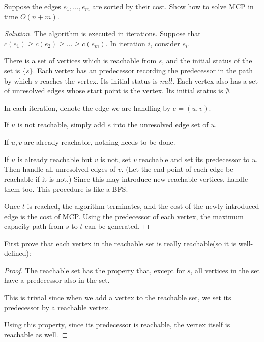 


    \maketitle

    \begin{thm}{}{}
        Suppose the edges $e_1,\dots, e_m$ are sorted by their cost. Show how to solve MCP in time $O(n+m)$.
    \end{thm}
    \begin{proof}[Solution]
        The algorithm is executed in iterations. Suppose that $c(e_1)\geq c(e_2)\geq\dots\geq c(e_m)$. In iteration $i$, consider $e_i$. 
        
        There is a set of vertices which is reachable from $s$, and the initial status of the set is $\{s\}$. 
        Each vertex has an predecessor recording the predecessor in the path by which $s$ reaches the vertex. Its initial status is $null$. 
        Each vertex also has a set of unresolved edges whose start point is the vertex. Its initial status is $\emptyset$.
        
        In each iteration, denote the edge we are handling by $e=(u,v)$. 
        
        If $u$ is not reachable, simply add $e$ into the unresolved edge set of $u$. 
        
        If $u,v$ are already reachable, nothing needs to be done. 
        
        If $u$ is already reachable but $v$ is not, set $v$ reachable and set its predecessor to $u$. 
        Then handle all unresolved edges of $v$. (Let the end point of each edge be reachable if it is not.)
        Since this may introduce new reachable vertices, handle them too. This procedure is like a BFS. 
        
        Once $t$ is reached, the algorithm terminates, and the cost of the newly introduced edge is the cost of MCP. 
        Using the predecessor of each vertex, the maximum capacity path from $s$ to $t$ can be generated.
    \end{proof}
    
    \bigskip
    
    First prove that each vertex in the reachable set is really reachable(so it is well-defined): 
    \begin{proof}[Proof]
        The reachable set has the property that, except for $s$, all vertices in the set have a predecessor also in the set. 
        
        This is trivial since when we add a vertex to the reachable set, we set its predecessor by a reachable vertex. 
        
        Using this property, since its predecessor is reachable, the vertex itself is reachable as well. 
    \end{proof}
    
